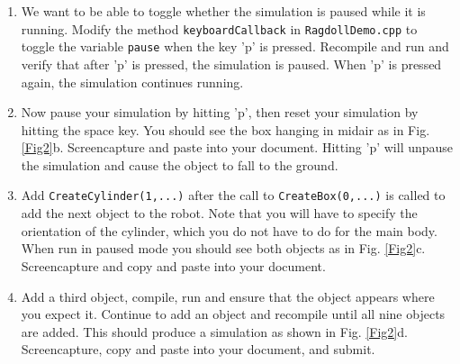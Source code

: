 \documentclass[12pt]{article}
\begin{document}
\begin{enumerate}
\item We want to be able to toggle whether the simulation is paused while it is running.  Modify the method \verb|keyboardCallback| in \verb|RagdollDemo.cpp| to toggle the variable \verb|pause| when the key 'p' is pressed.  Recompile and run and verify that after 'p' is pressed, the simulation is paused.  When 'p' is pressed again, the simulation continues running.  

\item Now pause your simulation by hitting 'p', then reset your simulation by hitting the space key.  You should see the box hanging in midair as in Fig. \ref{Fig2}b. Screencapture and paste into your document. Hitting 'p' will unpause the simulation and cause the object to fall to the ground.

\item Add \texttt{CreateCylinder(1,...)} after the call to \verb|CreateBox(0,...)| is called to add the next object to the robot. Note that you will have to specify the orientation of the cylinder, which you do not have to do for the main body. When run in paused mode you should see both objects as in Fig. \ref{Fig2}c. Screencapture and copy and paste into your document.

\item Add a third object, compile, run and ensure that the object appears where you expect it. Continue to add an object and recompile until all nine objects are added. This should produce a simulation as shown in Fig. \ref{Fig2}d. Screencapture, copy and paste into your document, and submit.
\end{enumerate}
\end{document}

